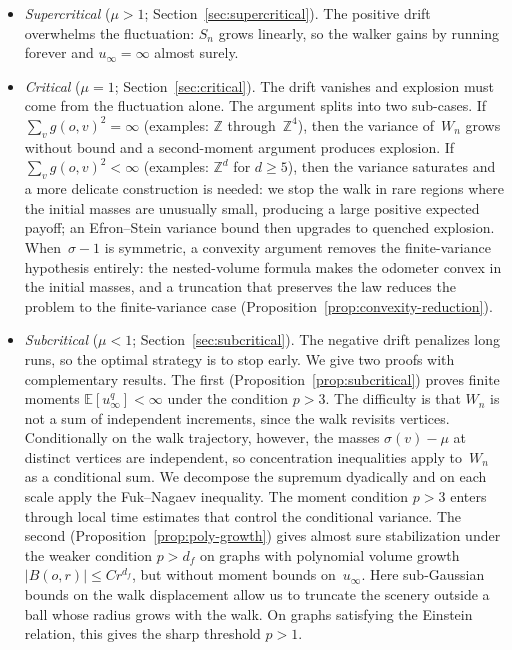 \documentclass[11pt]{amsart}
\theoremstyle{plain}
\theoremstyle{definition}
\newcommand{\Z}{\mathbb{Z}}
\newcommand{\E}{\mathbb{E}}
\begin{document}
	\begin{itemize}
		\item \textit{Supercritical} ($\mu>1$; Section~\ref{sec:supercritical}). The positive drift overwhelms the fluctuation: $S_n$ grows linearly, so the walker gains by running forever and $u_\infty=\infty$ almost surely.
		\item \textit{Critical} ($\mu=1$; Section~\ref{sec:critical}). The drift vanishes and explosion must come from the fluctuation alone. The argument splits into two sub-cases. If $\sum_v g(o,v)^2 = \infty$ (examples: $\Z$ through~$\Z^4$), then the variance of~$W_n$ grows without bound and a second-moment argument produces explosion. If $\sum_v g(o,v)^2<\infty$ (examples: $\Z^d$ for $d\geq 5$), then the variance saturates and a more delicate construction is needed: we stop the walk in rare regions where the initial masses are unusually small, producing a large positive expected payoff; an Efron--Stein variance bound then upgrades to quenched explosion.  When~$\sigma-1$ is symmetric, a convexity argument removes the finite-variance hypothesis entirely: the nested-volume formula makes the odometer convex in the initial masses, and a truncation that preserves the law reduces the problem to the finite-variance case (Proposition~\ref{prop:convexity-reduction}).
		\item \textit{Subcritical} ($\mu<1$; Section~\ref{sec:subcritical}). The negative drift penalizes long runs, so the optimal strategy is to stop early. We give two proofs with complementary results.
		The first (Proposition~\ref{prop:subcritical}) proves finite moments $\E[u_\infty^q]<\infty$ under the condition $p>3$. The difficulty is that $W_n$ is not a sum of independent increments, since the walk revisits vertices. Conditionally on the walk trajectory, however, the masses $\sigma(v)-\mu$ at distinct vertices are independent, so concentration inequalities apply to~$W_n$ as a conditional sum. We decompose the supremum dyadically and on each scale apply the Fuk--Nagaev inequality. The moment condition $p>3$ enters through local time estimates that control the conditional variance.
		The second (Proposition~\ref{prop:poly-growth}) gives almost sure stabilization under the weaker condition $p>d_f$ on graphs with polynomial volume growth $|B(o,r)|\leq Cr^{d_f}$, but without moment bounds on~$u_\infty$. Here sub-Gaussian bounds on the walk displacement allow us to truncate the scenery outside a ball whose radius grows with the walk. On graphs satisfying the Einstein relation, this gives the sharp threshold $p>1$.
	\end{itemize}
\end{document}
